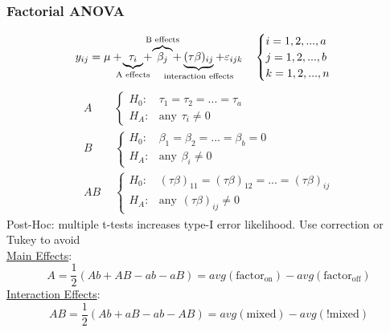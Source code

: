 \documentclass[twocolumn, 12pt]{article}    %
\begin{document}
\subsubsection*{Factorial ANOVA}
\begin{equation*}
    y_{ij} = \mu + \hspace{-7.5pt} \underbrace{\tau_i}_{\text{A effects}} \hspace{-7.5pt} + \hspace{-7.5pt} \overbrace{\beta_j}^{\text{B effects}} \hspace{-7.5pt} + \hspace{-17.5pt} \underbrace{(\tau\beta)_{ij}}_{\text{interaction effects}} \hspace{-17.5pt} + \varepsilon_{ijk} \hspace{10pt} \begin{cases} 
        i = 1,2,...,a\\
        j = 1,2,...,b\\
        k = 1,2,...,n
    \end{cases} 
\end{equation*}
\begin{align*}
    A &\hspace{5pt}\begin{cases}
        H_0: &\tau_1=\tau_2=...=\tau_a\\
        H_A: &\text{any} \hspace{5pt} \tau_i \neq0
    \end{cases}\\
    B &\hspace{5pt} \begin{cases}
        H_0: &\beta_1 = \beta_2=...=\beta_b=0\\
        H_A: &\text{any} \hspace{5pt} \beta_i \neq 0
    \end{cases}\\
    AB &\hspace{5pt} \begin{cases}
        H_0: &(\tau \beta)_{11} = (\tau\beta)_{12} =...=(\tau\beta)_{ij}\\
        H_A: &\text{any} \hspace{5pt} (\tau\beta)_{ij} \neq 0
    \end{cases}
\end{align*}
Post-Hoc: multiple t-tests increases type-I error likelihood. Use correction or Tukey to avoid\\
\underline{Main Effects}:
\begin{equation*}
    A = \frac{1}{2} (Ab + AB - ab - aB ) = avg(\text{factor}_{\text{on}}) - avg(\text{factor}_{\text{off}})
\end{equation*}
\underline{Interaction Effects}:
\begin{equation*}
    AB = \frac{1}{2} (Ab + aB - ab - AB) = avg(\text{mixed}) - avg(\text{!mixed})
\end{equation*}
\end{document}
